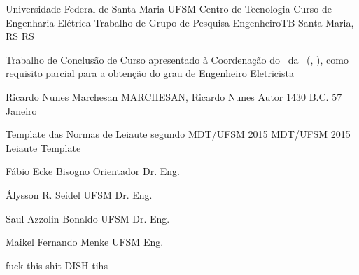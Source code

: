\set{\universidade}				{Universidade Federal de Santa Maria}
\set{\universidadeSigla}		{UFSM}
\set{\centroCurso}				{Centro de Tecnologia}
\set{\departamentoPrograma}		{Curso de Engenharia Elétrica}
\set{\grauTrabalho}				{Trabalho de Grupo de Pesquisa}
\set{\grauTitulacao}			{EngenheiroTB}
\set{\cidadeCEP}				{Santa Maria, RS}
\set{\estadoCEP}				{RS}

\set{\textoFolhaRosto}			{Trabalho de Conclusão de Curso apresentado à Coordenação do \departamentoPrograma\ da \universidade\ (\universidadeSigla , \estadoCEP), como requisito parcial para a obtenção do grau de}
\set{\grauFolhaRosto}			{Engenheiro Eletricista}

\set{\autor}					{Ricardo Nunes Marchesan}
\set{\autorCitacao}				{MARCHESAN, Ricardo Nunes}
\set{\autorGenero}				{Autor}
\set{\ano}						{1430 B.C.}
\set{\diaDefesa}				{57}
\set{\mesDefesa}				{Janeiro}

\set{\tituloTrabalho}			{Template das Normas de Leiaute segundo MDT/UFSM 2015}
\set{\tituloTrabalhoEn}			{MDT/UFSM 2015 Leiaute Template}


\set{\orientador}				{Fábio Ecke Bisogno}
\set{\orientadorGenero}			{Orientador}
\set{\orientadorTitulo}			{Dr. Eng.}

\set{\bancaUm}					{Álysson R. Seidel}
\set{\bancaUmSigla}				{UFSM}
\set{\bancaUmTitulo}			{Dr. Eng.}

\set{\bancaDois}				{Saul Azzolin Bonaldo}
\set{\bancaDoisSigla}			{UFSM}
\set{\bancaDoisTitulo}			{Dr. Eng.}

\set{\bancaTres}				{Maikel Fernando Menke}
\set{\bancaTresSigla}			{UFSM}
\set{\bancaTresTitulo}			{Eng.}

\set{\bancaQuatro}				{fuck this shit}
\set{\bancaQuatroSigla}			{DISH}
\set{\bancaQuatroTitulo}		{tihs}

